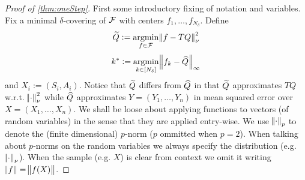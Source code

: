 \begin{proof}[Proof of \cref{thm:oneStep}]
  First some introductory fixing of notation and variables.
  Fix a minimal $\delta$-covering of $\mathcal{F}$
  with centers $f_1, \dots, f_{N_\delta}$.
  Define
  \[ \widetilde{Q} := \operatorname*{argmin}_{f \in \mathcal{F}} \norm{f - TQ}_{\nu}^2 \]
  \[ k^* := \operatorname*{argmin}_{k \in [N_\delta]} \norm{f_k - \widehat{Q}}_\infty \]
  and $ X_i := (S_i, A_i) $.
  Notice that $\widetilde{Q}$ differs from $\widehat{Q}$ in that
  $\widetilde{Q}$ approximates $TQ$ w.r.t. $\norm{\cdot}^2_\nu$ while
  $\widehat{Q}$ approximates $Y = (Y_1, \dots, Y_n)$ in mean squared error over
  $X = (X_1, \dots, X_n)$.
  We shall be loose about applying functions to vectors
  (of random variables)
  in the sense that they are applied entry-wise.
  We use $\norm{\cdot}_p$ to denote the (finite dimensional) $p$-norm
  ($p$ ommitted when $p=2$).
  When talking about $p$-norms on the random variables we always specify
  the distribution (e.g. $\norm{\cdot}_\nu$).
  When the sample (e.g. $X$) is clear from context we omit it writing
  $\norm{f} = \norm{f(X)}$.
  

\end{proof}
